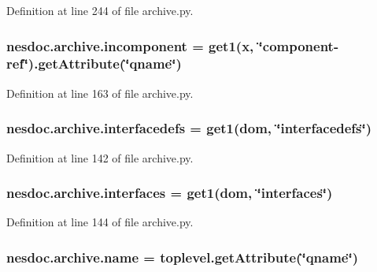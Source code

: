 Definition at line 244 of file archive.\+py.

\subsubsection[{\texorpdfstring{incomponent}{incomponent}}]{\setlength{\rightskip}{0pt plus 5cm}nesdoc.\+archive.\+incomponent = {\bf get1}(x, \char`\"{}component-\/ref\char`\"{}).get\+Attribute(\char`\"{}qname\char`\"{})}\hypertarget{namespacenesdoc_1_1archive_a872547b2674079bd08bf292f2ae65ab7}{}\label{namespacenesdoc_1_1archive_a872547b2674079bd08bf292f2ae65ab7}


Definition at line 163 of file archive.\+py.

\subsubsection[{\texorpdfstring{interfacedefs}{interfacedefs}}]{\setlength{\rightskip}{0pt plus 5cm}nesdoc.\+archive.\+interfacedefs = {\bf get1}({\bf dom}, \char`\"{}interfacedefs\char`\"{})}\hypertarget{namespacenesdoc_1_1archive_afe4518e3eebbcac2da1b4f8d561aa5d9}{}\label{namespacenesdoc_1_1archive_afe4518e3eebbcac2da1b4f8d561aa5d9}


Definition at line 142 of file archive.\+py.

\subsubsection[{\texorpdfstring{interfaces}{interfaces}}]{\setlength{\rightskip}{0pt plus 5cm}nesdoc.\+archive.\+interfaces = {\bf get1}({\bf dom}, \char`\"{}interfaces\char`\"{})}\hypertarget{namespacenesdoc_1_1archive_a9aa3880654d334dce3324daf7592ad8a}{}\label{namespacenesdoc_1_1archive_a9aa3880654d334dce3324daf7592ad8a}


Definition at line 144 of file archive.\+py.

\subsubsection[{\texorpdfstring{name}{name}}]{\setlength{\rightskip}{0pt plus 5cm}nesdoc.\+archive.\+name = toplevel.\+get\+Attribute(\char`\"{}qname\char`\"{})}\hypertarget{namespacenesdoc_1_1archive_ac1e3ca5ea254f2d542c19d1fd474e6d5}{}\label{namespacenesdoc_1_1archive_ac1e3ca5ea254f2d542c19d1fd474e6d5}


